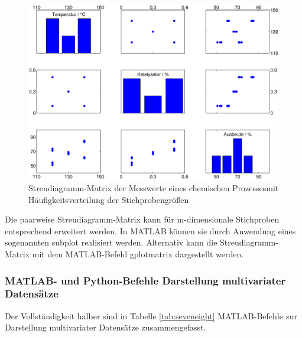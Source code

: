 \noindent 
\begin{figure}[H]
  \centerline{\includegraphics[width=1\textwidth]{Kapitel7/Bilder/image7}}
  \caption{Streudiagramm-Matrix der Messwerte eines chemischen Prozessesmit H\"{a}ufigkeitsverteilung der Stichprobengr\"{o}{\ss}en}
  \label{fig:ChemischeIndustrie3}
\end{figure}

\noindent Die paarweise Streudiagramm-Matrix kann f\"{u}r m-dimensionale Stichproben entsprechend erweitert werden. In MATLAB k\"{o}nnen sie durch Anwendung eines sogenannten subplot realisiert werden. Alternativ kann die Streudiagramm-Matrix mit dem MATLAB-Befehl gplotmatrix dargestellt werden. 



\clearpage

\subsubsection{MATLAB- und Python-Befehle Darstellung multivariater Datens\"{a}tze}

\noindent Der Vollst\"{a}ndigkeit halber sind in Tabelle \ref{tab:seveneight} MATLAB-Befehle zur Darstellung multivariater Datens\"{a}tze zusammengefasst.

